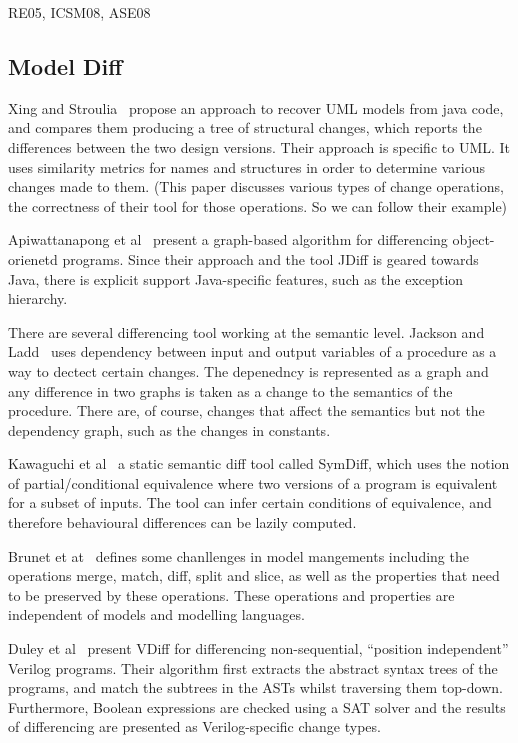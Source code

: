 \documentclass{acm_proc_article-sp}
\begin{document}
   RE05, ICSM08, ASE08
   
\subsection{Model Diff}
Xing and Stroulia~\cite{xing05ase} propose an approach to recover UML models from java code, and compares them producing a tree of structural changes, which reports the differences between the
two design versions.  Their approach is specific to UML. It uses similarity metrics for names and structures in order to determine various changes made to them. (This paper discusses various types of change operations, the correctness of their tool for those operations. So we can follow their example)

Apiwattanapong et al~\cite{Apiwattanapong:2004:DAO:1025115.1025202} present a graph-based algorithm for differencing object-orienetd programs. Since their approach and the tool JDiff is geared towards Java, there is explicit support Java-specific features, such as the exception hierarchy.




There are several differencing tool working at the semantic level. Jackson and Ladd~\cite{Jackson:1994:SDT:645543.655704} uses dependency between input and output variables of a procedure as a way to dectect certain changes. The depenedncy is represented as a graph and any difference in two graphs is taken as a change to the semantics of the procedure. There are, of course, changes that affect the semantics but not the dependency graph, such as the changes in constants.

Kawaguchi et al~\cite{Kawaguchietal2010} a static semantic diff tool called SymDiff, which uses the notion of partial/conditional equivalence where two versions of a program is equivalent for a subset of inputs.  The tool can infer certain conditions of equivalence, and therefore behavioural differences can be lazily computed. 

Brunet et at~\cite{brunet06gamma} defines some chanllenges in model mangements including the operations merge, match, diff, split and slice, as well as the properties that need to be preserved by these operations. These operations and properties are independent of models and modelling languages.

Duley et al~\cite{Duley:2010:PDA:1858996.1859093} present VDiff for differencing non-sequential, ``position independent'' Verilog programs. Their algorithm first extracts the abstract syntax trees of the programs, and match the subtrees in the ASTs whilst traversing them top-down. Furthermore, Boolean expressions are checked using a SAT solver and the results of differencing are presented as Verilog-specific change types.
\end{document}
